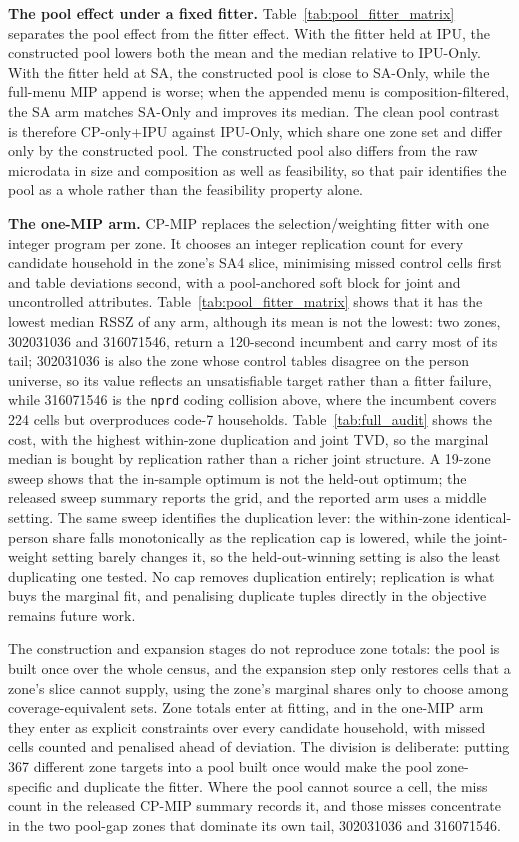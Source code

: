 \documentclass[review]{elsarticle}
\begin{document}
\textbf{The pool effect under a fixed fitter.} Table~\ref{tab:pool_fitter_matrix} separates the pool effect from the fitter effect. With the fitter held at IPU, the constructed pool lowers both the mean and the median relative to IPU-Only. With the fitter held at SA, the constructed pool is close to SA-Only, while the full-menu MIP append is worse; when the appended menu is composition-filtered, the SA arm matches SA-Only and improves its median. The clean pool contrast is therefore CP-only+IPU against IPU-Only, which share one zone set and differ only by the constructed pool. The constructed pool also differs from the raw microdata in size and composition as well as feasibility, so that pair identifies the pool as a whole rather than the feasibility property alone.

\textbf{The one-MIP arm.} CP-MIP replaces the selection/weighting fitter with one integer program per zone. It chooses an integer replication count for every candidate household in the zone's SA4 slice, minimising missed control cells first and table deviations second, with a pool-anchored soft block for joint and uncontrolled attributes. Table~\ref{tab:pool_fitter_matrix} shows that it has the lowest median RSSZ of any arm, although its mean is not the lowest: two zones, 302031036 and 316071546, return a 120-second incumbent and carry most of its tail; 302031036 is also the zone whose control tables disagree on the person universe, so its value reflects an unsatisfiable target rather than a fitter failure, while 316071546 is the \texttt{nprd} coding collision above, where the incumbent covers 224 cells but overproduces code-7 households. Table~\ref{tab:full_audit} shows the cost, with the highest within-zone duplication and joint TVD, so the marginal median is bought by replication rather than a richer joint structure. A 19-zone sweep shows that the in-sample optimum is not the held-out optimum; the released sweep summary reports the grid, and the reported arm uses a middle setting. The same sweep
identifies the duplication lever: the within-zone identical-person share falls
monotonically as the replication cap is lowered, while the joint-weight setting
barely changes it, so the held-out-winning setting is also the least duplicating
one tested. No cap removes duplication entirely; replication is what buys the
marginal fit, and penalising duplicate tuples directly in the objective remains
future work.

The construction and expansion stages do not reproduce zone totals: the pool is
built once over the whole census, and the expansion step only restores cells
that a zone's slice cannot supply, using the zone's marginal shares only to
choose among coverage-equivalent sets. Zone totals enter at fitting, and in the
one-MIP arm they enter as explicit constraints over every candidate household,
with missed cells counted and penalised ahead of deviation. The division is
deliberate: putting 367 different zone targets into a pool built once would make
the pool zone-specific and duplicate the fitter. Where the pool cannot source a
cell, the miss count in the released CP-MIP summary records it, and those misses
concentrate in the two pool-gap zones that dominate its own tail, 302031036 and
316071546.
\end{document}
